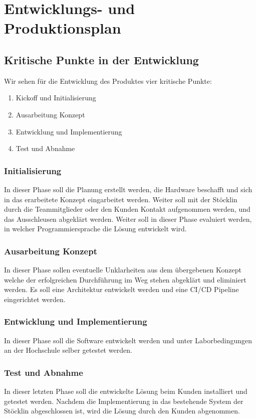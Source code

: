 \chapter{Entwicklungs- und Produktionsplan}

\section{Kritische Punkte in der Entwicklung}
Wir sehen für die Entwicklung des Produktes vier kritische Punkte:
\begin{enumerate}
	\item Kickoff und Initialisierung
	\item Ausarbeitung Konzept
	\item Entwicklung und Implementierung
	\item Test und Abnahme
\end{enumerate}

\subsection{Initialisierung}
In dieser Phase soll die Planung erstellt werden, die Hardware beschafft und sich in das erarbeitete Konzept eingarbeitet werden. Weiter soll mit der Stöcklin durch die Teammitglieder oder den Kunden Kontakt aufgenommen werden, und das Ausschleusen abgeklärt werden. Weiter soll in dieser Phase evaluiert werden, in welcher Programmiersprache die Lösung entwickelt wird.

\subsection{Ausarbeitung Konzept}
In dieser Phase sollen eventuelle Unklarheiten aus dem übergebenen Konzept welche der erfolgreichen Durchführung im Weg stehen abgeklärt und eliminiert werden. Es soll eine Architektur entwickelt werden und eine CI/CD Pipeline eingerichtet werden.

\subsection{Entwicklung und Implementierung}
In dieser Phase soll die Software entwickelt werden und unter Laborbedingungen an der Hochschule selber getestet werden.

\subsection{Test und Abnahme}
In dieser letzten Phase soll die entwickelte Lösung beim Kunden installiert und getestet werden. Nachdem die Implementierung in das bestehende System der Stöcklin abgeschlossen ist, wird die Lösung durch den Kunden abgenommen.

